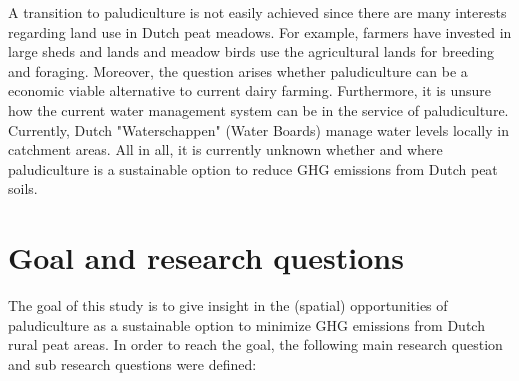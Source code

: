 A transition to paludiculture is not easily achieved since there are many interests regarding land use in Dutch peat meadows. For example, farmers have invested in large sheds and lands and meadow birds use the agricultural lands for breeding and foraging. Moreover, the question arises whether paludiculture can be a economic viable alternative to current dairy farming. Furthermore, it is unsure how the current water management system can be in the service of paludiculture. Currently, Dutch "Waterschappen" (Water Boards) manage water levels locally in catchment areas. All in all, it is currently unknown whether and where paludiculture is a sustainable option to reduce GHG emissions from Dutch peat soils. 

\section{Goal and research questions}
The goal of this study is to give insight in the (spatial) opportunities of paludiculture as a sustainable option to minimize GHG emissions from Dutch rural peat areas. In order to reach the goal, the following main research question and sub research questions were defined:

